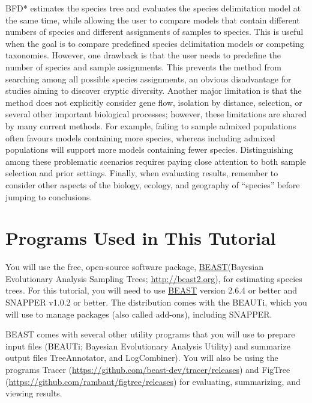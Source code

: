 \documentclass{article}
\newcommand{\program}[1]{#1\xspace}
\newcommand{\beast}{\href{http://beast2.org}{\program{BEAST}}\xspace}
\begin{document}
BFD* estimates the species tree and evaluates the species delimitation model at the same time, while allowing the user to compare models that contain different numbers of species and different assignments of samples to species. This is useful when the goal is to compare predefined species delimitation models or competing taxonomies. However, one drawback is that the user needs to predefine the number of species and sample assignments. This prevents the method from searching among all possible species assignments, an obvious disadvantage for studies aiming to discover cryptic diversity. Another major limitation is that the method does not explicitly consider gene flow, isolation by distance, selection, or several other important biological processes; however, these limitations are shared by many current methods. For example, failing to sample admixed populations often favours models containing more species, whereas including admixed populations will support more models containing fewer species. Distinguishing among these problematic scenarios requires paying close attention to both sample selection and prior settings. Finally, when evaluating results, remember to consider other aspects of the biology, ecology, and geography of ``species'' before jumping to conclusions.

\section{Programs Used in This Tutorial}
You will use the free, open-source software package, \beast (Bayesian
Evolutionary Analysis Sampling Trees;
\href{http://beast2.org}{\url{http://beast2.org}}), for
estimating species trees.
For this tutorial, you will need to use \beast version 2.6.4 or better and \program{SNAPPER} v1.0.2 or better. 
The distribution comes with the \program{BEAUTi}, which you will use to manage packages (also called add-ons), including \program{SNAPPER}.

\program{BEAST} comes with several other utility programs that you will use to prepare 
input files (\program{BEAUTi}; Bayesian Evolutionary Analysis
Utility) and summarize output files \program{TreeAnnotator}, and \program{LogCombiner}).
You will also be using the programs \program{Tracer}
(\href{https://github.com/beast-dev/tracer/releases}{\url{https://github.com/beast-dev/tracer/releases}})
and \program{FigTree}
(\href{https://github.com/rambaut/figtree/releases}{\url{https://github.com/rambaut/figtree/releases}})
for evaluating, summarizing, and viewing results.
\end{document}
